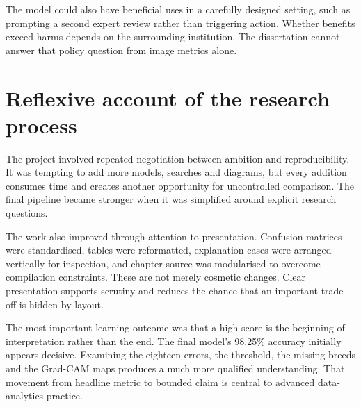 The model could also have beneficial uses in a carefully designed setting, such as prompting a second expert review rather than triggering action. Whether benefits exceed harms depends on the surrounding institution. The dissertation cannot answer that policy question from image metrics alone.

\section{Reflexive account of the research process}
The project involved repeated negotiation between ambition and reproducibility. It was tempting to add more models, searches and diagrams, but every addition consumes time and creates another opportunity for uncontrolled comparison. The final pipeline became stronger when it was simplified around explicit research questions.

The work also improved through attention to presentation. Confusion matrices were standardised, tables were reformatted, explanation cases were arranged vertically for inspection, and chapter source was modularised to overcome compilation constraints. These are not merely cosmetic changes. Clear presentation supports scrutiny and reduces the chance that an important trade-off is hidden by layout.

The most important learning outcome was that a high score is the beginning of interpretation rather than the end. The final model's 98.25\% accuracy initially appears decisive. Examining the eighteen errors, the threshold, the missing breeds and the Grad-CAM maps produces a much more qualified understanding. That movement from headline metric to bounded claim is central to advanced data-analytics practice.
